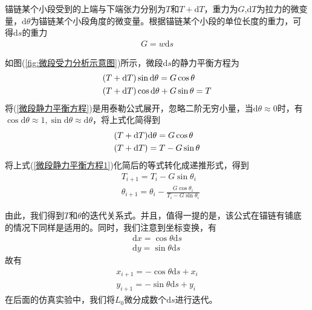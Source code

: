 \documentclass[UTF8]{ctexbook}
\theoremstyle{nonumberplain}
\begin{document}
            \par
            锚链某个小段受到的上端与下端张力分别为$T$和$T+\mathrm{d}T$，重力为$G$,$\mathrm{d}T$为拉力的微变量，$\mathrm{d}\theta$为锚链某个小段角度的微变量。根据锚链某个小段的单位长度的重力，可得$\mathrm{d}s$的重力
            \begin{align*}
            G = w\mathrm{d}s
            \end{align*}
            \par
            如图(\ref{fig:微段受力分析示意图})所示，微段$\mathrm{d}s$的静力平衡方程为
            \begin{align}
            \label{微段静力平衡方程}
            & (T+\mathrm{d}T)\sin \mathrm{d}\theta = G\cos\theta\\
            & (T+\mathrm{d}T) \cos \mathrm{d}\theta+G\sin \theta = T\notag
            \end{align}
            将(\ref{微段静力平衡方程})是用泰勒公式展开，忽略二阶无穷小量，当$\mathrm{d}\theta \approx 0$时，有$\cos \mathrm{d}\theta \approx 1,\sin \mathrm{d}\theta \approx \mathrm{d}\theta$，将上式化简得到
            \begin{align}
            \label{微段静力平衡方程1}
            & (T+\mathrm{d}T)\mathrm{d}\theta = G \cos\theta\\
            & (T+\mathrm{d}T) = T - G\sin \theta\notag
            \end{align}
            将上式(\ref{微段静力平衡方程1})化简后的等式转化成递推形式，得到
            \begin{align*}
            & T_{i+1} = T_i -G\sin \theta_i\\
            & \theta_{i+1} = \theta_i - \frac{G\cos\theta_i}{T_i - G\sin \theta_i}
            \end{align*}
            \par
            由此，我们得到$T$和$\theta$的迭代关系式。并且，值得一提的是，该公式在锚链有铺底的情况下同样是适用的。同时，我们注意到坐标变换，有
            \begin{align*}
            \mathrm{d}x = \cos \theta \mathrm{d}s\\
            \mathrm{d}y = \sin \theta \mathrm{d}s
            \end{align*}
            故有
            \begin{align*}
            x_{i+1} = -\cos\theta\mathrm{d}s+x_i\\
            y_{i+1} = -\sin\theta\mathrm{d}s+y_i
            \end{align*}
            在后面的仿真实验中，我们将$L_0$微分成数个$\mathrm{d}s$进行迭代。
\end{document}
